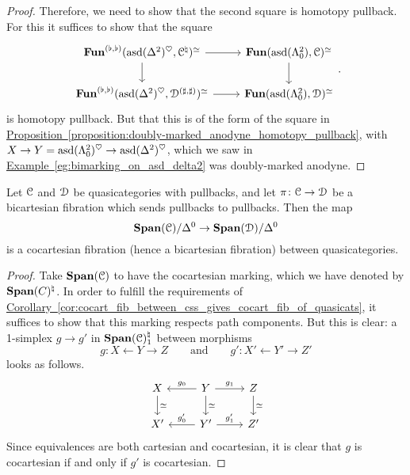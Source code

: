 \documentclass[main.tex]{subfiles}
\begin{document}
\begin{proof}
  Therefore, we need to show that the second square is homotopy pullback. For this it suffices to show that the square
  \begin{equation*}
    \begin{tikzcd}
      \Fun^{(\flat, \flat)}(\asd(\Delta^{2})^{\heartsuit}, \category{C}^{\natural})^{\simeq}
      \arrow[r]
      \arrow[d]
      & \Fun(\asd(\Lambda^{2}_{0}), \category{C})^{\simeq}
      \arrow[d]
      \\
      \Fun^{(\flat, \flat)}(\asd(\Delta^{2})^{\heartsuit}, \category{D}^{(\sharp, \sharp)})^{\simeq}
      \arrow[r]
      & \Fun(\asd(\Lambda^{2}_{0}), \category{D})^{\simeq}
    \end{tikzcd}.
  \end{equation*}
  is homotopy pullback. But that this is of the form of the square in \hyperref[proposition:doubly-marked_anodyne_homotopy_pullback]{Proposition~\ref*{proposition:doubly-marked_anodyne_homotopy_pullback}}, with $X \to Y = \mathrm{asd}(\Lambda^{2}_{0})^{\heartsuit} \to \mathrm{asd}(\Delta^{2})^{\heartsuit}$, which we saw in \hyperref[eg:bimarking_on_asd_delta2]{Example~\ref*{eg:bimarking_on_asd_delta2}} was doubly-marked anodyne.
\end{proof}

\begin{theorem}
  Let $\mathcal{C}$ and $\mathcal{D}$ be quasicategories with pullbacks, and let $\pi\colon \mathcal{C} \to \mathcal{D}$ be a bicartesian fibration which sends pullbacks to pullbacks. Then the map
  \begin{equation*}
    \mathbf{Span}(\mathcal{C})/\Delta^{0} \to \mathbf{Span}(\mathcal{D})/\Delta^{0}
  \end{equation*}
  is a cocartesian fibration (hence a bicartesian fibration) between quasicategories.
\end{theorem}
\begin{proof}
  Take $\mathbf{Span}(\mathcal{C})$ to have the cocartesian marking, which we have denoted by $\mathbf{Span}(C)^{\natural}$. In order to fulfill the requirements of \hyperref[cor:cocart_fib_between_css_gives_cocart_fib_of_quasicats]{Corollary~\ref*{cor:cocart_fib_between_css_gives_cocart_fib_of_quasicats}}, it suffices to show that this marking respects path components. But this is clear: a 1-simplex $g \to g'$ in $\mathbf{Span}(\mathcal{C})^{\natural}_{1}$ between morphisms
  \begin{equation*}
    g\colon X \leftarrow Y \to Z \qquad\text{and}\qquad g'\colon X' \leftarrow Y' \to Z'
  \end{equation*}
  looks as follows.
  \begin{equation*}
    \begin{tikzcd}
      X
      \arrow[d, "\simeq"]
      & Y
      \arrow[l, swap, "g_{0}"]
      \arrow[r, "g_{1}"]
      \arrow[d, "\simeq"]
      & Z
      \arrow[d, "\simeq"]
      \\
      X'
      & Y'
      \arrow[l, swap, "g'_{0}"]
      \arrow[r, "g'_{1}"]
      & Z'
    \end{tikzcd}
  \end{equation*}
  Since equivalences are both cartesian and cocartesian, it is clear that $g$ is cocartesian if and only if $g'$ is cocartesian.
\end{proof}
\end{document}
